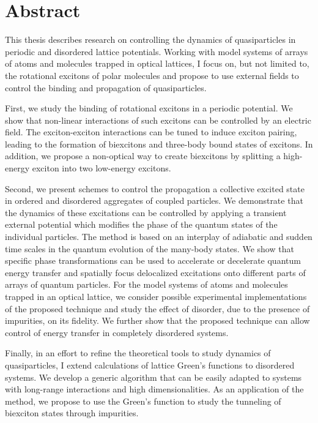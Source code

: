 
\chapter{Abstract}

This thesis describes research on controlling the dynamics of quasiparticles in 
 periodic and disordered lattice potentials. Working with model systems of arrays of atoms and molecules trapped in  optical lattices, 
I focus on, but not limited to, the rotational excitons of polar molecules and propose to use external fields to 
control the binding and propagation of quasiparticles. 

First, we study the binding of  rotational excitons in a periodic potential. We show that non-linear interactions of such excitons can
 be controlled by an electric field. The exciton-exciton interactions can be tuned
 to induce exciton pairing, leading to the formation of biexcitons and three-body bound states of excitons. In addition, we propose a non-optical way to create biexcitons by splitting a high-energy exciton into two 
low-energy excitons. 

Second, we present schemes to control the propagation a collective
 excited state in ordered and disordered aggregates of coupled particles. We demonstrate that the dynamics of these excitations can be controlled by
 applying a transient external potential which modifies the phase of the quantum
 states of the individual particles. The method is based on an interplay of adiabatic
 and sudden time scales in the quantum evolution of the many-body states. We show
 that specific phase transformations can be used to accelerate or decelerate quantum
 energy transfer and spatially focus delocalized excitations onto different parts of
arrays of quantum particles. For the model systems of atoms and molecules trapped in an optical lattice, we consider possible experimental implementations
 of the proposed technique and study the effect of disorder, due to the presence of
 impurities, on its fidelity. We further show that the proposed technique can allow
 control of energy transfer in completely disordered systems.
 

Finally, in an effort to refine the theoretical tools to study dynamics of quasiparticles, I extend calculations of lattice 
Green's functions to disordered systems. We develop a generic algorithm that can 
be easily adapted to systems with long-range interactions and high dimensionalities. As an application of the method, we propose 
to use the Green's function to study the tunneling of biexciton states through
 impurities.


